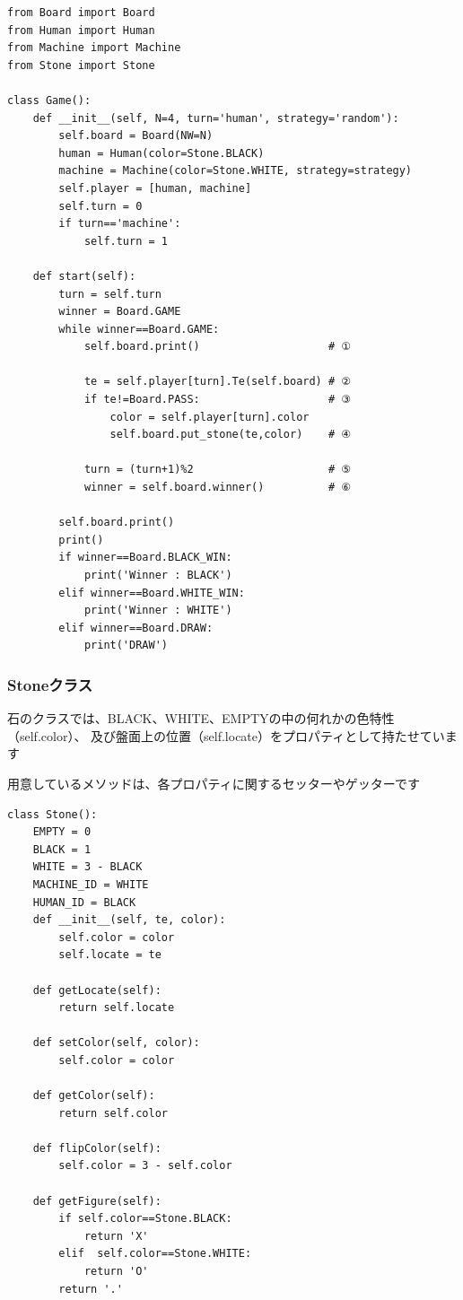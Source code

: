 \documentclass[uplatex,a4paper,11pt,oneside,openany]{jsbook}
\begin{document}
\begin{lstlisting}[caption=Game class,label=othello01]
from Board import Board
from Human import Human
from Machine import Machine
from Stone import Stone

class Game():
    def __init__(self, N=4, turn='human', strategy='random'):
        self.board = Board(NW=N)
        human = Human(color=Stone.BLACK)
        machine = Machine(color=Stone.WHITE, strategy=strategy)
        self.player = [human, machine]
        self.turn = 0
        if turn=='machine':
            self.turn = 1

    def start(self):
        turn = self.turn
        winner = Board.GAME
        while winner==Board.GAME:
            self.board.print()                    # ①

            te = self.player[turn].Te(self.board) # ②
            if te!=Board.PASS:                    # ③
                color = self.player[turn].color
                self.board.put_stone(te,color)    # ④

            turn = (turn+1)%2                     # ⑤
            winner = self.board.winner()          # ⑥

        self.board.print()
        print()
        if winner==Board.BLACK_WIN:
            print('Winner : BLACK')
        elif winner==Board.WHITE_WIN:
            print('Winner : WHITE')
        elif winner==Board.DRAW:
            print('DRAW')
\end{lstlisting}

\subsubsection{Stoneクラス}

石のクラスでは、BLACK、WHITE、EMPTYの中の何れかの色特性（self.color）、
及び盤面上の位置（self.locate）をプロパティとして持たせています

用意しているメソッドは、各プロパティに関するセッターやゲッターです

\begin{lstlisting}[caption=Stone class,label=othello04]
class Stone():
    EMPTY = 0
    BLACK = 1
    WHITE = 3 - BLACK
    MACHINE_ID = WHITE
    HUMAN_ID = BLACK
    def __init__(self, te, color):
        self.color = color
        self.locate = te

    def getLocate(self):
        return self.locate

    def setColor(self, color):
        self.color = color

    def getColor(self):
        return self.color

    def flipColor(self):
        self.color = 3 - self.color

    def getFigure(self):
        if self.color==Stone.BLACK:
            return 'X'
        elif  self.color==Stone.WHITE:
            return 'O'
        return '.'
\end{lstlisting}
\end{document}
